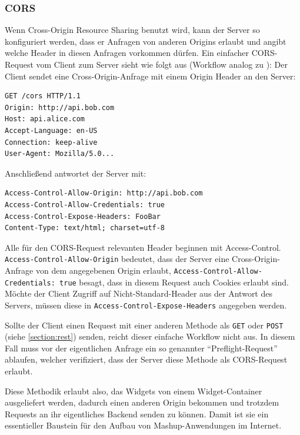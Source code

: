 \subsubsection*{CORS}
Wenn Cross-Origin Resource Sharing benutzt wird, kann der Server so konfiguriert werden, dass er Anfragen von anderen Origins erlaubt und angibt welche Header in diesen Anfragen vorkommen dürfen. Ein einfacher CORS-Request vom Client zum Server sieht wie folgt aus (Workflow analog zu \cite{Hossain2012}):
Der Client sendet eine Cross-Origin-Anfrage mit einem Origin Header an den Server:
\begin{lstlisting}
GET /cors HTTP/1.1
Origin: http://api.bob.com
Host: api.alice.com
Accept-Language: en-US
Connection: keep-alive
User-Agent: Mozilla/5.0...
\end{lstlisting}
Anschließend antwortet der Server mit:
\begin{lstlisting}
Access-Control-Allow-Origin: http://api.bob.com
Access-Control-Allow-Credentials: true
Access-Control-Expose-Headers: FooBar
Content-Type: text/html; charset=utf-8
\end{lstlisting}
Alle für den CORS-Request relevanten Header beginnen mit Access-Control. \texttt{Access\allowbreak -Control\allowbreak -Allow\allowbreak -Origin} bedeutet, dass der Server eine Cross-Origin-Anfrage von dem angegebenen Origin erlaubt, \texttt{Access\allowbreak -Control\allowbreak -Allow\allowbreak -Credentials: true} besagt, dass in diesem Request auch Cookies erlaubt sind. Möchte der Client Zugriff auf Nicht-Standard-Header aus der Antwort des Servers, müssen diese in \texttt{Access\allowbreak -Control\allowbreak -Expose\allowbreak -Headers} angegeben werden.

Sollte der Client einen Request mit einer anderen Methode als \texttt{GET} oder \texttt{POST} (siehe \ref{section:rest}) senden, reicht dieser einfache Workflow nicht aus. In diesem Fall muss vor der eigentlichen Anfrage ein so genannter "`Preflight-Request"' ablaufen, welcher verifiziert, dass der Server diese Methode als CORS-Request erlaubt.

Diese Methodik erlaubt also, das Widgets von einem Widget-Container ausgeliefert werden, dadurch einen anderen Origin bekommen und trotzdem Requests an ihr eigentliches Backend senden zu können. Damit ist sie ein essentieller Baustein für den Aufbau von Mashup-Anwendungen im Internet.

